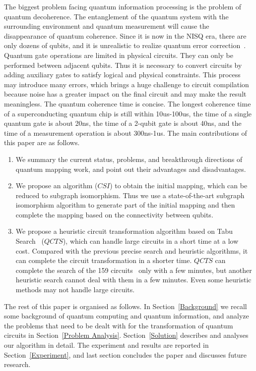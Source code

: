 \documentclass[runningheads]{llncs}
\begin{document}
The biggest problem facing quantum information processing is the problem of quantum decoherence. The entanglement of the quantum system with the surrounding environment and quantum measurement will cause the disappearance of quantum coherence. Since it is now in the NISQ era, there are only dozens of qubits, and it is unrealistic to realize quantum error correction~\cite{2018QuantumPreskill}. Quantum gate operations are limited in physical circuits. They can only be performed between adjacent qubits. Thus it is necessary to convert circuits by adding auxiliary gates to satisfy logical and physical constraints. This process may introduce many errors, which brings a huge challenge to circuit compilation because noise has a greater impact on the final circuit and may make the result meaningless. The quantum coherence time is concise. The longest coherence time of a superconducting quantum chip is still within 10us-100us, the time of a single quantum gate is about 20ns, the time of a 2-qubit gate is about 40ns, and the time of a measurement operation is about 300ns-1us. The main contributions of this paper are as follows.
	\begin{enumerate}
		\item We summary the current status, problems, and breakthrough directions of quantum mapping work, and point out their advantages and disadvantages. 
		\item We propose an algorithm ($CSI$) to obtain the initial mapping, which can be reduced to subgraph isomorphism. Thus we use a state-of-the-art subgraph isomorphism algorithm to generate part of the initial mapping and then complete the mapping based on the connectivity between qubits.
		\item We propose a heuristic circuit transformation algorithm based on Tabu Search~\cite{Glover1990} ($QCTS$), which can handle large circuits in a short time at a low cost. Compared with the previous precise search and heuristic algorithms, it can complete the circuit transformation in a shorter time. $QCTS$ can complete the search of the 159 circuits~\cite{Zulehner2017} only with a few minutes, but another heuristic search cannot deal with them in a few minutes. Even some heuristic methods may not handle large circuits.
	\end{enumerate}
	The rest of this paper is organised as follows. In Section~\ref{Background} we recall some background of quantum computing and quantum information,	and analyze the problems that need to be dealt with for the transformation of quantum circuits in Section~\ref{Problem Analysis}. Section~\ref{Solution} describes and analyses our algorithm in detail. The experiment and results are reported in Section~\ref{Experiment}, and last section concludes the paper and discusses future research.
\end{document}
